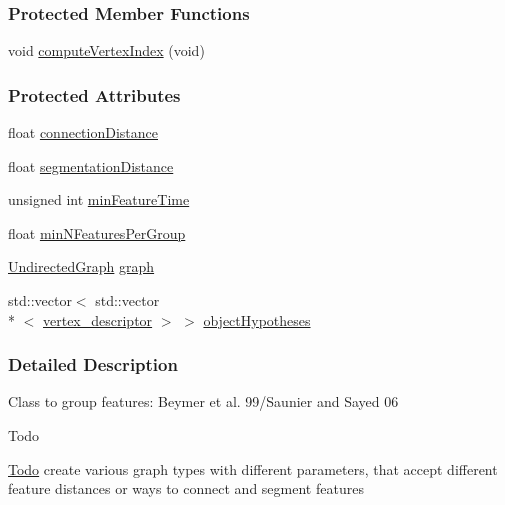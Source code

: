 \subsubsection*{Protected Member Functions}
\begin{DoxyCompactItemize}
\item 
void \hyperlink{classFeatureGraph_a61e7574915745b2e13cbc0a9a80f8a4c}{compute\-Vertex\-Index} (void)
\end{DoxyCompactItemize}
\subsubsection*{Protected Attributes}
\begin{DoxyCompactItemize}
\item 
float \hyperlink{classFeatureGraph_a745795fe1a62032d4b9195002e563fc1}{connection\-Distance}
\item 
float \hyperlink{classFeatureGraph_a6a305cc99a686467c4675e00e02813f1}{segmentation\-Distance}
\item 
unsigned int \hyperlink{classFeatureGraph_ac021778f7dcd3bb2757b5c48a71eba66}{min\-Feature\-Time}
\item 
float \hyperlink{classFeatureGraph_a37d15b91071f53ead6520b98ff6c97f5}{min\-N\-Features\-Per\-Group}
\item 
\hyperlink{classFeatureGraph_a165ef4f8fdfb5cefa12f372d55d95923}{Undirected\-Graph} \hyperlink{classFeatureGraph_a810fe2e6048a3449a3eda4c81379fd91}{graph}
\item 
std\-::vector$<$ std\-::vector\\*
$<$ \hyperlink{classFeatureGraph_ab85a700fea1a3a494db459c0f8277844}{vertex\-\_\-descriptor} $>$ $>$ \hyperlink{classFeatureGraph_ac708d4533c31452dd5df60ba7fe75022}{object\-Hypotheses}
\end{DoxyCompactItemize}


\subsubsection{Detailed Description}
Class to group features\-: Beymer et al. 99/\-Saunier and Sayed 06 \begin{DoxyRefDesc}{Todo}
\item[\hyperlink{todo__todo000002}{Todo}]create various graph types with different parameters, that accept different feature distances or ways to connect and segment features \end{DoxyRefDesc}


